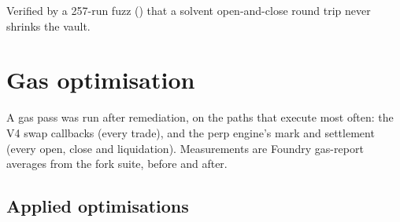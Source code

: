 \noindent Verified by a 257-run fuzz
() that a
solvent open-and-close round trip never shrinks the vault.

\section{Gas optimisation}
\label{sec:gas}

A gas pass was run after remediation, on the paths that execute most often: the
V4 swap callbacks (every trade), and the perp engine's mark and settlement (every
open, close and liquidation). Measurements are Foundry gas-report averages from
the fork suite, before and after.

\subsection{Applied optimisations}


